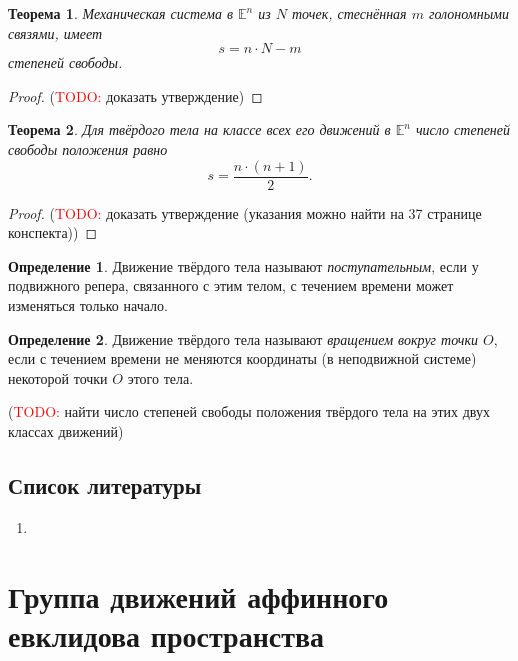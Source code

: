 \documentclass{article}
\theoremstyle{definition}
\newtheorem{definition}{Определение}[section]
\theoremstyle{plain}
\newtheorem{theorem}{Теорема}[section]
\theoremstyle{remark}
\numberwithin{equation}{section}
\begin{document}
\begin{theorem}
  Механическая система в $\mathbb{E}^n$ из $N$ точек, стеснённая $m$ голономными
  связями, имеет
  \begin{equation*}
    s = n \cdot N - m
  \end{equation*}
  степеней свободы.
\end{theorem}

\begin{proof}
  (\textcolor{red}{TODO:} доказать утверждение)
\end{proof}

\begin{theorem}
  Для твёрдого тела на классе всех его движений в $\mathbb{E}^n$ число степеней
  свободы положения равно
  \begin{equation*}
    s = \frac{n \cdot (n + 1)}{2}.
  \end{equation*}
\end{theorem}

\begin{proof}
  (\textcolor{red}{TODO:} доказать утверждение (указания можно найти на 37
  странице конспекта))
\end{proof}

\begin{definition}
  Движение твёрдого тела называют \textit{поступательным}, если у подвижного
  репера, связанного с этим телом, с течением времени может изменяться только
  начало.
\end{definition}

\begin{definition}
  Движение твёрдого тела называют \textit{вращением вокруг точки $O$}, если
  с течением времени не меняются координаты (в неподвижной системе) некоторой
  точки $O$ этого тела.
\end{definition}

(\textcolor{red}{TODO:} найти число степеней свободы положения твёрдого тела на
этих двух классах движений)

\subsection{Список литературы}
\begin{enumerate}
  \item \cite{lectures}
\end{enumerate}

\pagebreak

\section{Группа движений аффинного евклидова пространства}
\end{document}
